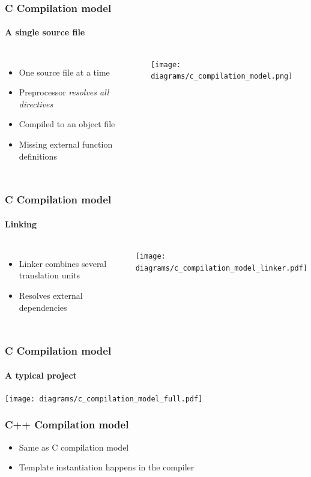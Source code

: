 \documentclass{beamer}
\begin{document}
\begin{frame}
\end{frame}

\begin{frame}
    \frametitle{C Compilation model}
    \framesubtitle{A single source file}
    \begin{columns}[t]
        \column{4cm}
        \begin{itemize}
            \item One source file at a time
            \item Preprocessor \emph{resolves all directives}
            \item Compiled to an object file
            \item Missing external function definitions
        \end{itemize}
        \column[T]{8cm}
        \texttt{[image: diagrams/c\_compilation\_model.png]}
    \end{columns}
\end{frame}

\begin{frame}
    \frametitle{C Compilation model}
    \framesubtitle{Linking}
    \begin{columns}[t]
        \column{4cm}
        \begin{itemize}
            \item Linker combines several translation units
            \item Resolves external dependencies
        \end{itemize}
        \column[T]{8cm}
        \texttt{[image: diagrams/c\_compilation\_model\_linker.pdf]}
    \end{columns}
\end{frame}

\begin{frame}
    \frametitle{C Compilation model}
    \framesubtitle{A typical project}
    \texttt{[image: diagrams/c\_compilation\_model\_full.pdf]}
\end{frame}

\begin{frame}
    \frametitle{\alert{C++} Compilation model}
    \begin{itemize}
        \item Same as C compilation model
        \item Template instantiation happens in the compiler
    \end{itemize}
\end{frame}
\end{document}
